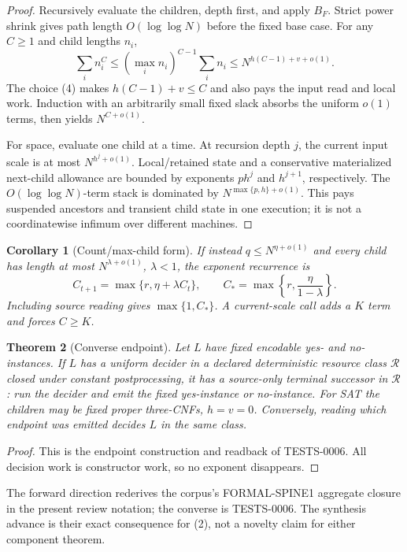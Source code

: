 \documentclass[11pt]{article}
\newtheorem{theorem}{Theorem}
\newtheorem{corollary}[theorem]{Corollary}
\begin{document}
\begin{proof}
Recursively evaluate the children, depth first, and apply $B_F$.  Strict
power shrink gives path length $O(\log\log N)$ before the fixed base case.
For any $C\ge1$ and child lengths $n_i$,
\[
 \sum_i n_i^C
 \le (\max_i n_i)^{C-1}\sum_i n_i
 \le N^{h(C-1)+v+o(1)}.                                  \tag{6}
\]
The choice (4) makes $h(C-1)+v\le C$ and also pays the input read and local
work.  Induction with an arbitrarily small fixed slack absorbs the uniform
$o(1)$ terms, then yields $N^{C+o(1)}$.

For space, evaluate one child at a time.  At recursion depth $j$, the current
input scale is at most $N^{h^j+o(1)}$.  Local/retained state and a conservative
materialized next-child allowance are bounded by exponents $p h^j$ and
$h^{j+1}$, respectively.  The $O(\log\log N)$-term stack is dominated by
$N^{\max\{p,h\}+o(1)}$.  This pays suspended ancestors and transient child
state in one execution; it is not a coordinatewise infimum over different
machines.
\end{proof}

\begin{corollary}[Count/max-child form]
If instead $q\le N^{\eta+o(1)}$ and every child has length at most
$N^{\lambda+o(1)}$, $\lambda<1$, the exponent recurrence is
\[
 C_{t+1}=\max\{r,\eta+\lambda C_t\},
 \qquad C_*=\max\left\{r,\frac{\eta}{1-\lambda}\right\}. \tag{7}
\]
Including source reading gives $\max\{1,C_*\}$.  A current-scale call adds a
$K$ term and forces $C\ge K$.
\end{corollary}

\begin{theorem}[Converse endpoint]
Let $L$ have fixed encodable yes- and no-instances.  If $L$ has a uniform
decider in a declared deterministic resource class $\mathcal R$ closed under
constant postprocessing, it has a source-only terminal successor in
$\mathcal R$: run the decider and emit the fixed yes-instance or no-instance.
For SAT the children may be fixed proper three-CNFs, $h=v=0$.  Conversely,
reading which endpoint was emitted decides $L$ in the same class.
\end{theorem}

\begin{proof}
This is the endpoint construction and readback of TESTS-0006.  All decision
work is constructor work, so no exponent disappears.
\end{proof}

The forward direction rederives the corpus's FORMAL-SPINE1 aggregate closure
in the present review notation; the converse is TESTS-0006.  The synthesis
advance is their exact consequence for (2), not a novelty claim for either
component theorem.
\end{document}
